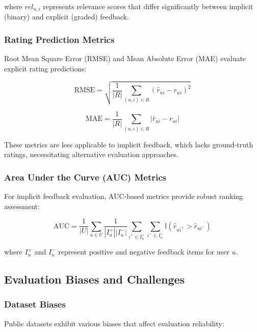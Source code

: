 where $rel_{u,i}$ represents relevance scores that differ significantly between implicit (binary) and explicit (graded) feedback.

\subsubsection{Rating Prediction Metrics}
Root Mean Square Error (RMSE) and Mean Absolute Error (MAE) evaluate explicit rating predictions:

\begin{equation}
\text{RMSE} = \sqrt{\frac{1}{|R|} \sum_{(u,i) \in R} (\hat{r}_{ui} - r_{ui})^2}
\label{eq:rmse}
\end{equation}

\begin{equation}
\text{MAE} = \frac{1}{|R|} \sum_{(u,i) \in R} |\hat{r}_{ui} - r_{ui}|
\label{eq:mae}
\end{equation}

These metrics are less applicable to implicit feedback, which lacks ground-truth ratings, necessitating alternative evaluation approaches.

\subsubsection{Area Under the Curve (AUC) Metrics}
For implicit feedback evaluation, AUC-based metrics provide robust ranking assessment:

\begin{equation}
\text{AUC} = \frac{1}{|U|} \sum_{u \in U} \frac{1}{|I_u^+||I_u^-|} \sum_{i^+ \in I_u^+} \sum_{i^- \in I_u^-} \mathbb{I}(\hat{r}_{ui^+} > \hat{r}_{ui^-})
\label{eq:auc}
\end{equation}

where $I_u^+$ and $I_u^-$ represent positive and negative feedback items for user $u$.

\subsection{Evaluation Biases and Challenges}

\subsubsection{Dataset Biases}
Public datasets exhibit various biases that affect evaluation reliability:

